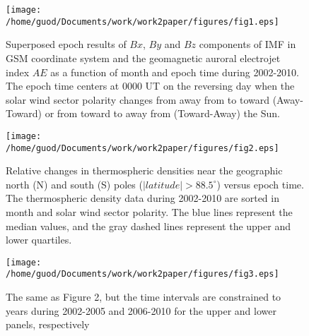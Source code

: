 \documentclass[draft, grl]{/home/guod/Documents/template/agu_template/AGUTeX}
\begin{document}
\begin{figure}
    \centering
    \noindent\texttt{[image: 
    /home/guod/Documents/work/work2paper/figures/fig1.eps]}
    \caption{Superposed epoch results of $Bx$, $By$ and $Bz$ components of IMF 
        in GSM coordinate system and the geomagnetic auroral electrojet index
        $AE$ as a function of month and epoch time during 2002-2010. 
        The epoch time centers at 0000 UT on the reversing day when the solar 
        wind sector polarity changes from away from to toward (Away-Toward) or
        from toward to away from (Toward-Away) the Sun. }
    \label{figure1}
\end{figure}
\begin{figure}
    \centering
    \noindent\texttt{[image: 
    /home/guod/Documents/work/work2paper/figures/fig2.eps]}
    \caption{Relative changes in thermospheric densities near the geographic 
        north (N) and south (S) poles ($\left|latitude\right| > 88.5^\circ$)
        versus epoch time. The thermospheric density data during 2002-2010 are
        sorted in month and solar wind sector polarity. The blue lines 
        represent the median values, and the gray dashed lines represent the
        upper and lower quartiles.}
    \label{figure2}
\end{figure}
\begin{figure}
    \centering
    \noindent\texttt{[image: 
    /home/guod/Documents/work/work2paper/figures/fig3.eps]}
    \caption{The same as Figure 2, but the time intervals are constrained to
        years during 2002-2005 and 2006-2010 for the upper and lower panels,
        respectively}
    \label{figure3}
\end{figure}

\end{document}
